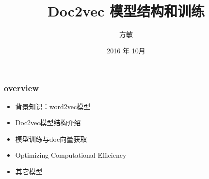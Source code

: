 \documentclass[notheorems]{beamer}
\begin{document}
\title[CHIVOX]{Doc2vec 模型结构和训练}
\author[mf34]{方敏}
\date[Oct, 2016]{2016 年 10月}

\frame{\titlepage}

\begin{frame}
\frametitle{overview}
\begin{itemize}
\item 背景知识：word2vec模型
\item Doc2vec模型结构介绍
\item 模型训练与doc向量获取 %
\item Optimizing Computational Efficiency
\item 其它模型
\end{itemize}
\end{frame}
\end{document}
